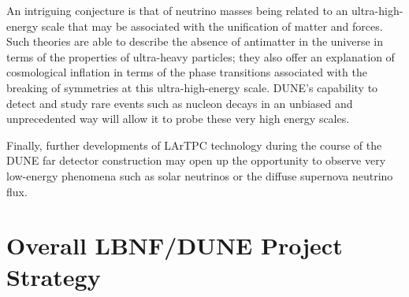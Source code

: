 An intriguing %
conjecture is that of neutrino masses being related to an %
ultra-high-energy scale that may be associated with the unification of matter and forces. Such theories are able to describe the absence of antimatter in the universe in terms of the properties of ultra-heavy particles; they also %
offer an explanation %
of cosmological inflation in terms of the phase transitions associated with the breaking of symmetries at this ultra-high-energy scale. DUNE's capability to detect and study rare events such as nucleon decays in an unbiased and unprecedented way will allow it to probe these very high energy scales. 



Finally, further developments of LArTPC %
technology during the course of the DUNE far detector construction may open up the opportunity
to observe very low-energy phenomena such as solar neutrinos or the diffuse supernova neutrino flux.


\section{Overall LBNF/DUNE Project Strategy} %

